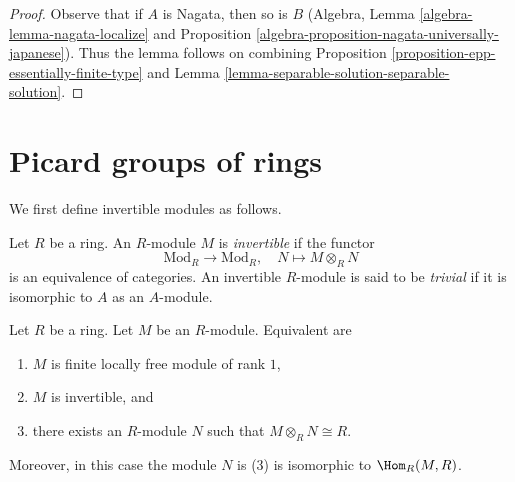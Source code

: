 \begin{proof}
Observe that if $A$ is Nagata, then so is $B$
(Algebra, Lemma \ref{algebra-lemma-nagata-localize} and
Proposition \ref{algebra-proposition-nagata-universally-japanese}).
Thus the lemma follows on combining
Proposition \ref{proposition-epp-essentially-finite-type}
and
Lemma \ref{lemma-separable-solution-separable-solution}.
\end{proof}







\section{Picard groups of rings}
\label{section-picard}

\noindent
We first define invertible modules as follows.

\begin{definition}
\label{definition-invertible}
Let $R$ be a ring. An $R$-module $M$ is {\it invertible} if the functor
$$
\text{Mod}_R \longrightarrow \text{Mod}_R,\quad
N \longmapsto M \otimes_R N
$$
is an equivalence of categories. An invertible $R$-module is said to be
{\it trivial} if it is isomorphic to $A$ as an $A$-module.
\end{definition}

\begin{lemma}
\label{lemma-invertible}
Let $R$ be a ring. Let $M$ be an $R$-module. Equivalent are
\begin{enumerate}
\item $M$ is finite locally free module of rank $1$,
\item $M$ is invertible, and
\item there exists an $R$-module $N$ such that $M \otimes_R N \cong R$.
\end{enumerate}
Moreover, in this case the module $N$ is (3) is isomorphic
to $\Hom_R(M, R)$.
\end{lemma}

